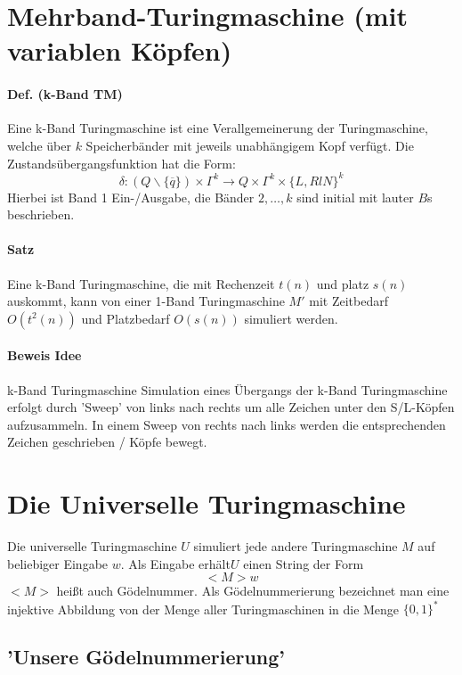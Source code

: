 \section{Mehrband-Turingmaschine (mit variablen Köpfen)}

\paragraph*{Def. (k-Band TM)} Eine k-Band Turingmaschine ist eine Verallgemeinerung der Turingmaschine, welche über $k$ Speicherbänder mit jeweils unabhängigem Kopf verfügt. Die Zustandsübergangsfunktion hat die Form: $$ \delta : (Q\backslash\{\overline{q}\}) \times \Gamma^k \rightarrow Q \times \Gamma^k \times \{L,RlN\}^k $$ Hierbei ist Band 1 Ein-/Ausgabe, die Bänder $2,\dots,k$ sind initial mit lauter $B$s beschrieben.

\paragraph*{Satz} Eine k-Band Turingmaschine, die mit Rechenzeit $t(n)$ und platz $s(n)$ auskommt, kann von einer 1-Band Turingmaschine $M'$ mit Zeitbedarf $O(t^2(n))$ und Platzbedarf $O(s(n))$ simuliert werden.

\paragraph*{Beweis Idee} k-Band Turingmaschine %
Simulation eines Übergangs der k-Band Turingmaschine erfolgt durch 'Sweep' von links nach rechts um alle Zeichen unter den S/L-Köpfen aufzusammeln. In einem Sweep von rechts nach links werden die entsprechenden Zeichen geschrieben / Köpfe bewegt.


\section{Die Universelle Turingmaschine}

Die universelle Turingmaschine $U$ simuliert jede andere Turingmaschine $M$ auf beliebiger Eingabe $w$. Als Eingabe erhält$U$ einen String der Form $$<M>w$$ $<M>$ heißt auch Gödelnummer. Als Gödelnummerierung bezeichnet man eine injektive Abbildung von der Menge aller Turingmaschinen in die Menge $\{0,1\}^*$ %

\subsection{'Unsere Gödelnummerierung'}

